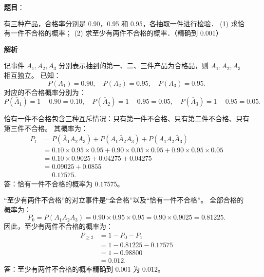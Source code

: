 \begin{answer}

\textbf{题目}：

有三种产品，合格率分别是 0.90，0.95 和 0.95，各抽取一件进行检验．
(1) 求恰有一件不合格的概率；
(2) 求至少有两件不合格的概率．（精确到 0.001）

\textbf{解析}

记事件 $A_1, A_2, A_3$ 分别表示抽到的第一、二、三件产品为合格品，则 $A_1, A_2, A_3$ 相互独立。
已知：
\nopagebreak[4]
\[P(A_1) = 0.90, \quad P(A_2) = 0.95, \quad P(A_3) = 0.95.\]
对应的不合格概率分别为：
\nopagebreak[4]
\[P(\bar{A}_1) = 1 - 0.90 = 0.10, \quad P(\bar{A}_2) = 1 - 0.95 = 0.05, \quad P(\bar{A}_3) = 1 - 0.95 = 0.05.\]


恰有一件不合格包含三种互斥情况：只有第一件不合格、只有第二件不合格、只有第三件不合格。
其概率为：
\nopagebreak[4]
\[\begin{aligned}
P_1 &= P(\bar{A}_1 A_2 A_3) + P(A_1 \bar{A}_2 A_3) + P(A_1 A_2 \bar{A}_3) \\
&= 0.10 \times 0.95 \times 0.95 + 0.90 \times 0.05 \times 0.95 + 0.90 \times 0.95 \times 0.05 \\
&= 0.10 \times 0.9025 + 0.04275 + 0.04275 \\
&= 0.09025 + 0.0855 \\
&= 0.17575.
\end{aligned}\]
答：恰有一件不合格的概率为 $0.17575$。


“至少有两件不合格”的对立事件是“全合格”以及“恰有一件不合格”。
全部合格的概率为：
\nopagebreak[4]
\[P_0 = P(A_1 A_2 A_3) = 0.90 \times 0.95 \times 0.95 = 0.90 \times 0.9025 = 0.81225.\]
因此，至少有两件不合格的概率为：
\nopagebreak[4]
\[\begin{aligned}
P_{\ge 2} &= 1 - P_0 - P_1 \\
&= 1 - 0.81225 - 0.17575 \\
&= 1 - 0.98800 \\
&= 0.012.
\end{aligned}\]
答：至少有两件不合格的概率精确到 0.001 为 $0.012$。



\end{answer}
